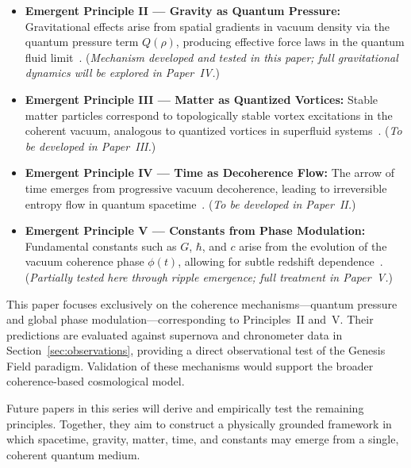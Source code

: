 \begin{itemize}[leftmargin=*]
    \item \textbf{Emergent Principle II — Gravity as Quantum Pressure:} Gravitational effects arise from spatial gradients in vacuum density via the quantum pressure term \( Q(\rho) \), producing effective force laws in the quantum fluid limit~\cite{volovik2003universe}. (\emph{Mechanism developed and tested in this paper; full gravitational dynamics will be explored in Paper~IV.})

    \item \textbf{Emergent Principle III — Matter as Quantized Vortices:} Stable matter particles correspond to topologically stable vortex excitations in the coherent vacuum, analogous to quantized vortices in superfluid systems~\cite{Fetter2009}. (\emph{To be developed in Paper~III.})

    \item \textbf{Emergent Principle IV — Time as Decoherence Flow:} The arrow of time emerges from progressive vacuum decoherence, leading to irreversible entropy flow in quantum spacetime~\cite{Kiefer2009,Zeh2007}. (\emph{To be developed in Paper~II.})

    \item \textbf{Emergent Principle V — Constants from Phase Modulation:} Fundamental constants such as \( G \), \( \hbar \), and \( c \) arise from the evolution of the vacuum coherence phase \( \phi(t) \), allowing for subtle redshift dependence~\cite{Uzan2011,Martins2017}. (\emph{Partially tested here through ripple emergence; full treatment in Paper~V.})
\end{itemize}

This paper focuses exclusively on the coherence mechanisms—quantum pressure and global phase modulation—corresponding to Principles~II and~V. Their predictions are evaluated against supernova and chronometer data in Section~\ref{sec:observations}, providing a direct observational test of the Genesis Field paradigm. Validation of these mechanisms would support the broader coherence-based cosmological model.

Future papers in this series will derive and empirically test the remaining principles. Together, they aim to construct a physically grounded framework in which spacetime, gravity, matter, time, and constants may emerge from a single, coherent quantum medium.

